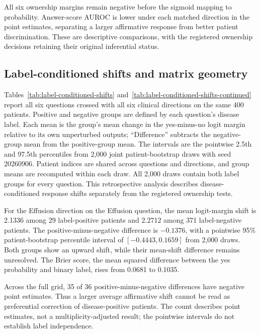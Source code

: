 All six ownership margins remain negative before the sigmoid mapping to
probability. Answer-score AUROC is lower under each matched direction in
the point estimates, separating a larger affirmative response from better
patient discrimination. These are descriptive comparisons, with the
registered ownership decisions retaining their original inferential status.

\subsection{Label-conditioned shifts and matrix geometry}

Tables~\ref{tab:label-conditioned-shifts} and~\ref{tab:label-conditioned-shifts-continued}
report all six questions crossed with all six clinical directions on the
same 400 patients. Positive and negative groups are defined by each
question's disease label. Each mean is the group's mean change in the
yes-minus-no logit margin relative to its own unperturbed outputs;
``Difference'' subtracts the negative-group mean from the positive-group
mean. The intervals are the pointwise 2.5th and 97.5th percentiles from
2,000 joint patient-bootstrap draws with seed 20260906. Patient indices
are shared across questions and directions, and group means are recomputed
within each draw. All 2,000 draws contain both label groups for every
question. This retrospective analysis describes disease-conditioned
response shifts separately from the registered ownership tests.

For the Effusion direction on the Effusion question, the mean logit-margin
shift is 2.1336 among 29 label-positive patients and 2.2712 among 371
label-negative patients. The positive-minus-negative difference is
$-0.1376$, with a pointwise 95\% patient-bootstrap percentile interval of
$[-0.4443,0.1659]$ from 2,000 draws. Both groups show an upward shift,
while their mean-shift difference remains unresolved. The Brier score,
the mean squared difference between the yes probability and binary label,
rises from 0.0681 to 0.1035.

Across the full grid, 35 of 36 positive-minus-negative differences have
negative point estimates. Thus a larger average affirmative shift cannot
be read as preferential correction of disease-positive patients. The
count describes point estimates, not a multiplicity-adjusted result;
the pointwise intervals do not establish label independence.



